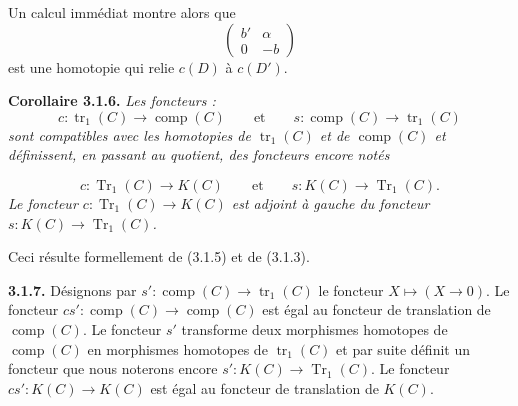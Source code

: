 Un calcul immédiat montre alors que
\begin{equation*}
  \begin{pmatrix}
    b' & \alpha\\
    0  & -b
  \end{pmatrix}
\end{equation*}
est une homotopie qui relie $c(D)$ à $c(D')$.

\noindent\textbf{Corollaire 3.1.6.}\quad
\emph{Les foncteurs :}
\begin{equation*}
  c\colon\operatorname{tr}_1(C)\longrightarrow\operatorname{comp}(C)
  \qquad\text{et}\qquad
  s\colon\operatorname{comp}(C)\longrightarrow\operatorname{tr}_1(C)
\end{equation*}
\emph{sont compatibles avec les homotopies de $\operatorname{tr}_1(C)$ et de
$\operatorname{comp}(C)$ et définissent, en passant au quotient, des foncteurs
encore notés}

\begin{equation*}
  c\colon\operatorname{Tr}_1(C)\longrightarrow K(C)
  \qquad\text{et}\qquad
  s\colon K(C)\longrightarrow\operatorname{Tr}_1(C).
\end{equation*}
\emph{Le foncteur $c\colon\operatorname{Tr}_1(C)\longrightarrow K(C)$ est
adjoint à gauche du foncteur
$s\colon K(C)\longrightarrow\operatorname{Tr}_1(C)$.}

Ceci résulte formellement de (3.1.5) et de (3.1.3).

\noindent\textbf{3.1.7.}\quad
{}
Désignons par
$s'\colon\operatorname{comp}(C)\longrightarrow\operatorname{tr}_1(C)$ le
foncteur $X\longmapsto(X\longrightarrow 0)$.
Le foncteur
$cs'\colon\operatorname{comp}(C)\longrightarrow\operatorname{comp}(C)$ est
égal au foncteur de translation de $\operatorname{comp}(C)$.
Le foncteur $s'$ transforme deux morphismes homotopes de
$\operatorname{comp}(C)$ en morphismes homotopes de $\operatorname{tr}_1(C)$ et
par suite définit un foncteur que nous noterons encore
$s'\colon K(C)\longrightarrow\operatorname{Tr}_1(C)$.
Le foncteur $cs'\colon K(C)\longrightarrow K(C)$ est égal au foncteur de
translation de $K(C)$.
